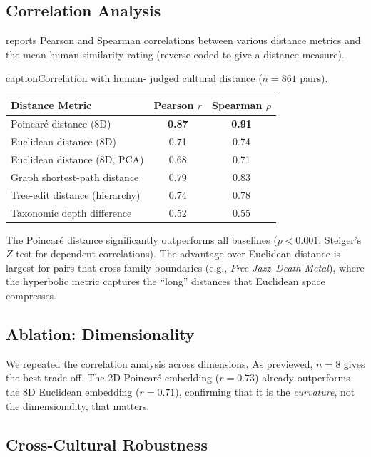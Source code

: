\documentclass[12pt,a4paper]{article}
\begin{document}
\subsection{Correlation Analysis}

 reports Pearson and Spearman correlations between various distance metrics and the mean human similarity rating (reverse-coded to give a distance measure).

\begin{table}[htbp]
\centering
caption{Correlation with human- judged cultural distance ($n = 861$ pairs).}
\label{tab:correlations}
\begin{tabular}{lcc}
\toprule
\textbf{Distance Metric} & \textbf{Pearson $r$} & \textbf{Spearman $\rho$} \\
\midrule
Poincar\'e distance (8D)          & \textbf{0.87} & \textbf{0.91} \\
Euclidean distance (8D)           & 0.71 & 0.74 \\
Euclidean distance (8D, PCA)      & 0.68 & 0.71 \\
Graph shortest-path distance      & 0.79 & 0.83 \\
Tree-edit distance (hierarchy)    & 0.74 & 0.78 \\
Taxonomic depth difference        & 0.52 & 0.55 \\
\bottomrule
\end{tabular}
\end{table}

The Poincar\'e distance significantly outperforms all baselines ($p < 0.001$, Steiger's $Z$-test for dependent correlations). The advantage over Euclidean distance is largest for pairs that cross family boundaries (e.g., \emph{Free Jazz}--\emph{Death Metal}), where the hyperbolic metric captures the ``long'' distances that Euclidean space compresses.

\subsection{Ablation: Dimensionality}

We repeated the correlation analysis across dimensions. As  previewed, $n = 8$ gives the best trade-off. The 2D Poincar\'e embedding ($r = 0.73$) already outperforms the 8D Euclidean embedding ($r = 0.71$), confirming that it is the \emph{curvature}, not the dimensionality, that matters.

\subsection{Cross-Cultural Robustness}
\end{document}
